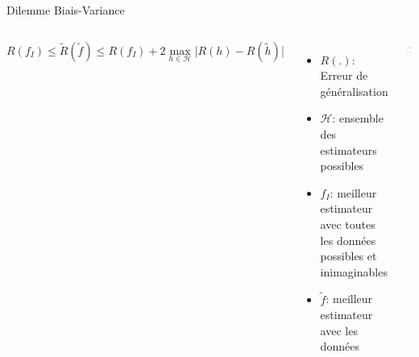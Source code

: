 \documentclass[presentation, aspectratio=169]{beamer}
\begin{document}
\begin{frame}{Dilemme Biais-Variance}
  \begin{columns}
    \begin{equation*}
      R(f_I) \le \tilde R(\tilde f) \le R(f_I)
      + 2\max_{h\in\mathcal H}\lvert R(h) - R(\tilde h)\rvert
    \end{equation*}
    \begin{itemize}
    \item $R(.)$: Erreur de généralisation
    \item $\mathcal H$: ensemble des estimateurs possibles
    \item $f_I$: meilleur estimateur avec toutes les données possibles
      et inimaginables
    \item $\tilde f$: meilleur estimateur avec les données
    \end{itemize}
    \includegraphics[width=\textwidth]{biais-variance}
  \end{columns}
\end{frame}
\end{document}
